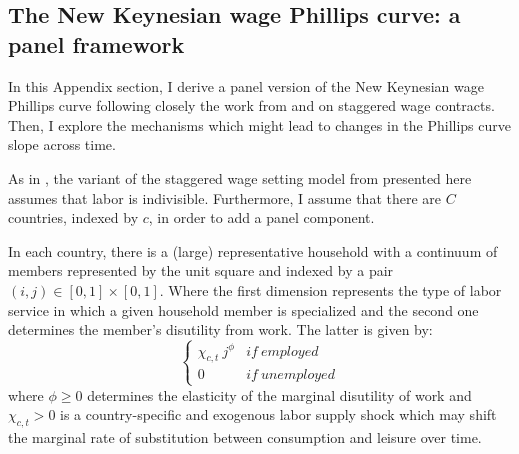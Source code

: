 \documentclass[12pt]{article}
\begin{document}
\begin{appendices}







\clearpage

\setcounter{table}{0}
\setcounter{figure}{0}
\setcounter{equation}{0}

\section{The New Keynesian wage Phillips curve: a panel framework \label{S_Theory}}

In this Appendix section, I derive a panel version of the New Keynesian wage Phillips curve following closely the work from \cite{Gali2011} and \cite{Erceg2000} on staggered wage contracts. Then, I explore the mechanisms which might lead to changes in the Phillips curve slope across time.

As in \cite{Gali2011}, the variant of the staggered wage setting model from \cite{Erceg2000} presented here assumes that labor is indivisible. Furthermore, I assume that there are $C$ countries, indexed by $c$, in order to add a panel component.

In each country, there is a (large) representative household with a continuum of members represented by the unit square and indexed by a pair $(i,j) \in [0,1] \times [0,1]$. Where the first dimension represents the type of labor service in which a given household member is specialized and the second one determines the member's disutility from work. The latter is given by:
\[ 
\left\{
\begin{array}{ll}
      \chi_{c,t} \ j^{\phi} & if \ employed \\
      0 & if \ unemployed
\end{array} 
\right. 
\]
where $\phi \geq 0$ determines the elasticity of the marginal disutility of work and $\chi_{c,t} > 0$ is a country-specific and exogenous labor supply shock which may shift the marginal rate of substitution between consumption and leisure over time.


\end{appendices}
\end{document}
